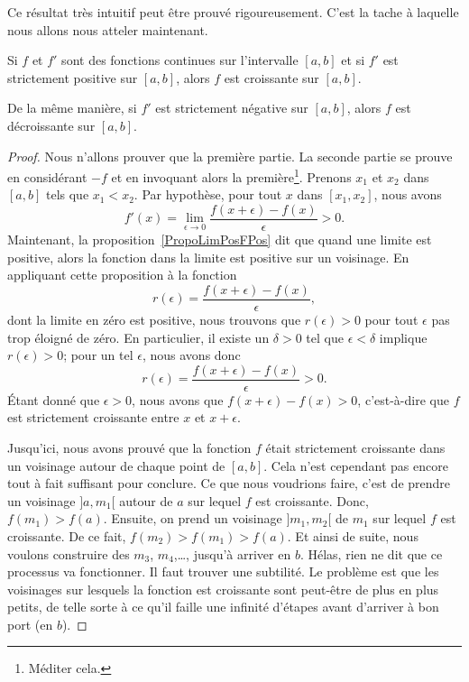 Ce résultat très intuitif peut être prouvé rigoureusement. C'est la tache à laquelle nous allons nous atteler maintenant.

\begin{proposition} \label{PropGFkZMwD}
	Si \( f\) et \( f'\) sont des fonctions continues sur l'intervalle \( [a,b]\) et si \( f'\) est strictement positive sur \( [a,b]\), alors \( f\) est croissante sur \( [a,b]\).

	De la même manière, si \( f'\) est strictement négative sur \( [a,b]\), alors \( f\) est décroissante sur \( [a,b]\).
\end{proposition}

\begin{proof}
	Nous n'allons prouver que la première partie. La seconde partie se prouve en considérant \( -f\) et en invoquant alors la première\footnote{Méditer cela.}. Prenons \( x_1\) et \( x_2\) dans \( [a,b]\) tels que \( x_1<x_2\). Par hypothèse, pour tout \( x\) dans \( [x_1,x_2]\), nous avons
	\begin{equation}
		f'(x)=\lim_{\epsilon\to 0}\frac{ f(x+\epsilon)-f(x) }{\epsilon} >0.
	\end{equation}
	Maintenant, la proposition~\ref{PropoLimPosFPos} dit que quand une limite est positive, alors la fonction dans la limite est positive sur un voisinage. En appliquant cette proposition à la fonction
	\begin{equation}
		r(\epsilon)=\frac{ f(x+\epsilon)-f(x) }{ \epsilon },
	\end{equation}
	dont la limite en zéro est positive, nous trouvons que \( r(\epsilon)>0\) pour tout \( \epsilon\) pas trop éloigné de zéro. En particulier, il existe un \( \delta>0\) tel que \( \epsilon<\delta\) implique \( r(\epsilon)>0\); pour un tel \( \epsilon\), nous avons donc
	\begin{equation}
		r(\epsilon)=\frac{ f(x+\epsilon)-f(x) }{ \epsilon }>0.
	\end{equation}
	Étant donné que \( \epsilon>0\), nous avons que \( f(x+\epsilon)-f(x)>0\), c'est-à-dire que \( f\) est strictement croissante entre \( x\) et \( x+\epsilon\).

	Jusqu'ici, nous avons prouvé que la fonction \( f\) était strictement croissante dans un voisinage autour de chaque point de \( [a,b]\). Cela n'est cependant pas encore tout à fait suffisant pour conclure. Ce que nous voudrions faire, c'est de prendre un voisinage \( ]a,m_1[\) autour de \( a\) sur lequel \( f\) est croissante. Donc, \( f(m_1)>f(a)\). Ensuite, on prend un voisinage \( ]m_1,m_2[\) de \( m_1\) sur lequel \( f\) est croissante. De ce fait, \( f(m_2)>f(m_1)>f(a)\). Et ainsi de suite, nous voulons construire des \( m_3\), \( m_4\),\ldots, jusqu'à arriver en \( b\). Hélas, rien ne dit que ce processus va fonctionner. Il faut trouver une subtilité. Le problème est que les voisinages sur lesquels la fonction est croissante sont peut-être de plus en plus petits, de telle sorte à ce qu'il faille une infinité d'étapes avant d'arriver à bon port (en \( b\)).


\end{proof}
